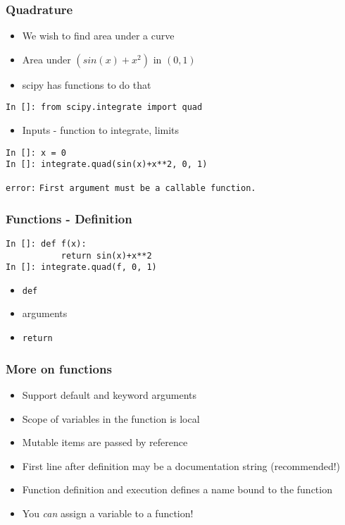 \documentclass[14pt,compress]{beamer}
\newcommand{\typ}[1]{\lstinline{#1}}
\begin{document}
\begin{frame}[fragile]
\frametitle{Quadrature}
\begin{itemize}
\item We wish to find area under a curve
\item Area under $(sin(x) + x^2)$ in $(0,1)$
\item scipy has functions to do that
\end{itemize}
\small{\typ{In []: from scipy.integrate import quad}}
\begin{itemize}
\item Inputs - function to integrate, limits
\end{itemize}
\begin{lstlisting}
In []: x = 0
In []: integrate.quad(sin(x)+x**2, 0, 1)
\end{lstlisting}
\alert{\typ{error:}}
\typ{First argument must be a callable function.}
\end{frame}

\begin{frame}[fragile]
\frametitle{Functions - Definition}
\begin{lstlisting}
In []: def f(x):
           return sin(x)+x**2
In []: integrate.quad(f, 0, 1)
\end{lstlisting}
\begin{itemize}
\item \typ{def}
\item arguments
\item \typ{return}
\end{itemize}
\end{frame}

\begin{frame}[fragile]
  \frametitle{More on functions}
  \begin{itemize}
  \item Support default and keyword arguments
  \item Scope of variables in the function is local
  \item Mutable items are \alert{passed by reference}
  \item First line after definition may be a documentation string
    (\alert{recommended!})
  \item Function definition and execution defines a name bound to the
    function
  \item You \emph{can} assign a variable to a function!
  \end{itemize}
\end{frame}
\end{document}
